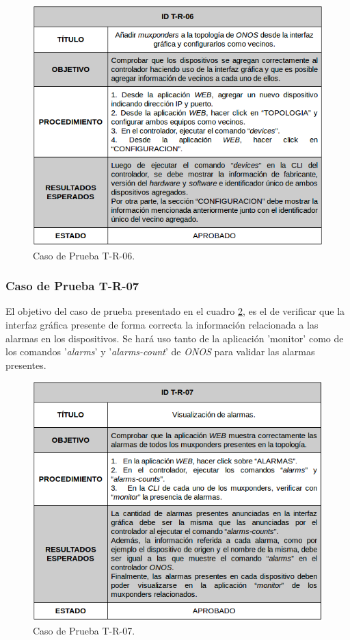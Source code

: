 \begin{figure}[H]
	\centering
	\includegraphics[scale=0.6]{Figures/test6.png}
	\caption{Caso de Prueba T-R-06.}
	\label{fig:test6}
  \end{figure}



  \subsubsection{Caso de Prueba T-R-07}

El objetivo del caso de prueba presentado en el cuadro \ref{fig:test7}, es el de verificar que la interfaz gráfica presente de forma correcta la información relacionada a las alarmas en los dispositivos. 
Se hará uso tanto de la aplicación 'monitor' como de los comandos '\textit{alarms}' y '\textit{alarms-count}' de \textit{ONOS} para validar las alarmas presentes.


\begin{figure}[H]
	\centering
	\includegraphics[scale=0.6]{Figures/test7.png}
	\caption{Caso de Prueba T-R-07.}
	\label{fig:test7}
  \end{figure}

